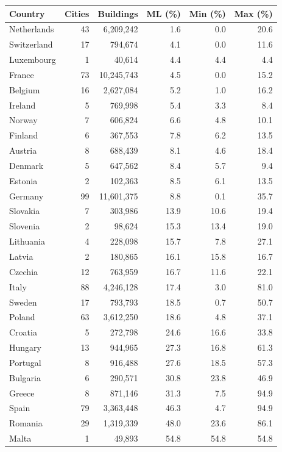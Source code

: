 \begin{tabular}{@{}lrrrrr@{}}
  \toprule
  \textbf{Country} & \textbf{Cities} & \textbf{Buildings} & \textbf{ML (\%)} & \textbf{Min (\%)} & \textbf{Max (\%)} \\
  \midrule
  Netherlands & 43 & 6,209,242 & 1.6 & 0.0 & 20.6 \\
  Switzerland & 17 & 794,674 & 4.1 & 0.0 & 11.6 \\
  Luxembourg & 1 & 40,614 & 4.4 & 4.4 & 4.4 \\
  France & 73 & 10,245,743 & 4.5 & 0.0 & 15.2 \\
  Belgium & 16 & 2,627,084 & 5.2 & 1.0 & 16.2 \\
  Ireland & 5 & 769,998 & 5.4 & 3.3 & 8.4 \\
  Norway & 7 & 606,824 & 6.6 & 4.8 & 10.1 \\
  Finland & 6 & 367,553 & 7.8 & 6.2 & 13.5 \\
  Austria & 8 & 688,439 & 8.1 & 4.6 & 18.4 \\
  Denmark & 5 & 647,562 & 8.4 & 5.7 & 9.4 \\
  Estonia & 2 & 102,363 & 8.5 & 6.1 & 13.5 \\
  Germany & 99 & 11,601,375 & 8.8 & 0.1 & 35.7 \\
  Slovakia & 7 & 303,986 & 13.9 & 10.6 & 19.4 \\
  Slovenia & 2 & 98,624 & 15.3 & 13.4 & 19.0 \\
  Lithuania & 4 & 228,098 & 15.7 & 7.8 & 27.1 \\
  Latvia & 2 & 180,865 & 16.1 & 15.8 & 16.7 \\
  Czechia & 12 & 763,959 & 16.7 & 11.6 & 22.1 \\
  Italy & 88 & 4,246,128 & 17.4 & 3.0 & 81.0 \\
  Sweden & 17 & 793,793 & 18.5 & 0.7 & 50.7 \\
  Poland & 63 & 3,612,250 & 18.6 & 4.8 & 37.1 \\
  Croatia & 5 & 272,798 & 24.6 & 16.6 & 33.8 \\
  Hungary & 13 & 944,965 & 27.3 & 16.8 & 61.3 \\
  Portugal & 8 & 916,488 & 27.6 & 18.5 & 57.3 \\
  Bulgaria & 6 & 290,571 & 30.8 & 23.8 & 46.9 \\
  Greece & 8 & 871,146 & 31.3 & 7.5 & 94.9 \\
  Spain & 79 & 3,363,448 & 46.3 & 4.7 & 94.9 \\
  Romania & 29 & 1,319,339 & 48.0 & 23.6 & 86.1 \\
  Malta & 1 & 49,893 & 54.8 & 54.8 & 54.8 \\
  \bottomrule
\end{tabular}